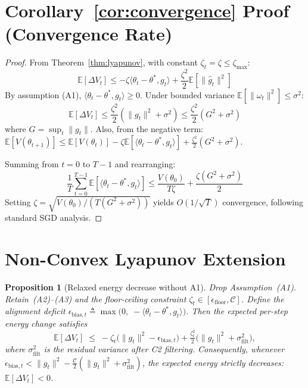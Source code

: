 \documentclass{article}
\newtheorem{proposition}{Proposition}
\begin{document}
\section{Corollary~\ref{cor:convergence} Proof (Convergence Rate)}
\label{sec:convergence-proof}

\begin{proof}
From Theorem~\ref{thm:lyapunov}, with constant $\zeta_t = \zeta \leq \zeta_{\max}$:
\begin{equation}
\mathbb{E}[\Delta V_t] \leq -\zeta \langle \theta_t - \theta^*, g_t \rangle
+ \frac{\zeta^2}{2}\mathbb{E}[\|\hat{g}_t\|^2]
\end{equation}
By assumption (A1), $\langle \theta_t - \theta^*, g_t \rangle \geq 0$.
Under bounded variance $\mathbb{E}[\|\omega_t\|^2] \leq \sigma^2$:
\begin{equation}
\mathbb{E}[\Delta V_t] \leq \frac{\zeta^2}{2}(\|g_t\|^2 + \sigma^2)
\leq \frac{\zeta^2}{2}(G^2 + \sigma^2)
\end{equation}
where $G = \sup_t \|g_t\|$. Also, from the negative term:
$\mathbb{E}[V(\theta_{t+1})] \leq \mathbb{E}[V(\theta_t)]
- \zeta \mathbb{E}[\langle \theta_t{-}\theta^*, g_t \rangle]
+ \frac{\zeta^2}{2}(G^2 + \sigma^2)$.

Summing from $t=0$ to $T{-}1$ and rearranging:
\begin{equation}
\frac{1}{T}\sum_{t=0}^{T-1} \mathbb{E}[\langle \theta_t{-}\theta^*, g_t \rangle]
\leq \frac{V(\theta_0)}{T\zeta} + \frac{\zeta(G^2 + \sigma^2)}{2}
\end{equation}
Setting $\zeta = \sqrt{V(\theta_0) / (T(G^2 + \sigma^2))}$
yields $O(1/\sqrt{T})$ convergence, following standard SGD analysis.
\end{proof}


\section{Non-Convex Lyapunov Extension}
\label{sec:nonconvex-ext}

\begin{proposition}[Relaxed energy decrease without A1]
\label{prop:nonconvex}
Drop Assumption~(A1). Retain~(A2)--(A3) and the floor-ceiling
constraint $\zeta_t \in [\epsilon_{\mathrm{floor}}, \mathcal{C}]$.
Define the \emph{alignment deficit}
$\epsilon_{\mathrm{bias},t} \triangleq \max\!\bigl(0,\;
-\langle \theta_t{-}\theta^*, g_t \rangle\bigr)$.
Then the expected per-step energy change satisfies
\begin{equation}
  \mathbb{E}[\Delta V_t]
  \;\leq\;
  -\zeta_t\!\bigl(\|g_t\|^2 - \epsilon_{\mathrm{bias},t}\bigr)
  + \tfrac{\zeta_t^2}{2}\bigl(\|g_t\|^2 + \sigma_{\mathrm{filt}}^2\bigr),
  \label{eq:relaxed-lyap}
\end{equation}
where $\sigma_{\mathrm{filt}}^2$ is the residual variance after C2
filtering. Consequently, whenever
$\epsilon_{\mathrm{bias},t} < \|g_t\|^2 - \tfrac{\mathcal{C}}{2}(\|g_t\|^2 + \sigma_{\mathrm{filt}}^2)$,
the expected energy strictly decreases:
$\mathbb{E}[\Delta V_t] < 0$.
\end{proposition}
\end{document}
